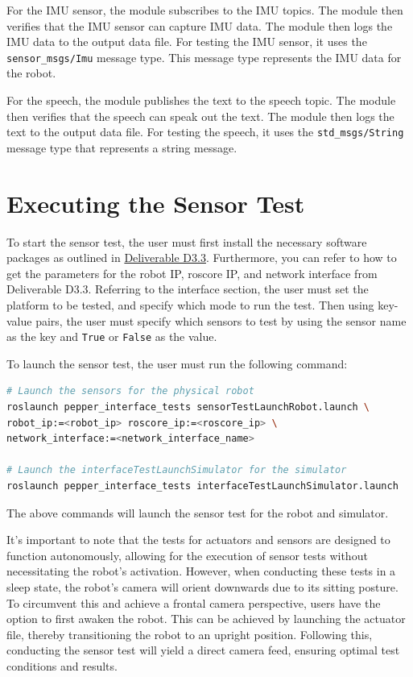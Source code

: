 \documentclass{CSSRforAfrica}
\begin{document}
For the IMU sensor, the module subscribes to the IMU topics. The module then verifies that the IMU sensor can capture IMU data. The
module then logs the IMU data to the output data file. For testing the IMU sensor, it uses the \texttt{sensor\_msgs/Imu} message type. This message type
represents the IMU data for the robot.

For the speech, the module publishes the text to the speech topic. The module then verifies that the speech can speak out the text. The
module then logs the text to the output data file. For testing the speech, it uses the \texttt{std\_msgs/String} message type that represents a string message.

\newpage


\section{Executing the Sensor Test}
To start the sensor test, the user must first install the necessary software packages as outlined in \href{https://cssr4africa.github.io/deliverables/CSSR4Africa_Deliverable_D3.3.pdf}
{Deliverable D3.3}. Furthermore, you can refer to how to get the parameters for the robot IP, roscore IP, and network interface from Deliverable D3.3.
Referring to the interface section, the user must set the platform to be tested, and specify which mode to run the test. Then using key-value pairs, the user must 
specify which sensors to test by using the sensor name as the key and \texttt{True} or \texttt{False} as the value. 


To launch the sensor test, the user must run the following command:

\begin{lstlisting}[style=withoutNumbering, language=bash]
# Launch the sensors for the physical robot
roslaunch pepper_interface_tests sensorTestLaunchRobot.launch \
robot_ip:=<robot_ip> roscore_ip:=<roscore_ip> \
network_interface:=<network_interface_name>

# Launch the interfaceTestLaunchSimulator for the simulator
roslaunch pepper_interface_tests interfaceTestLaunchSimulator.launch
\end{lstlisting}

The above commands will launch the sensor test for the robot and simulator. 

It's important to note that the tests for actuators and sensors are designed to function autonomously, allowing for the execution of sensor tests 
without necessitating the robot's activation. However, when conducting these tests in a sleep state, the robot's camera will orient downwards due 
to its sitting posture. To circumvent this and achieve a frontal camera perspective, users have the option to first awaken the robot. This can be 
achieved by launching the actuator file, thereby transitioning the robot to an upright position. Following this, conducting the sensor test will 
yield a direct camera feed, ensuring optimal test conditions and results. 
\end{document}
